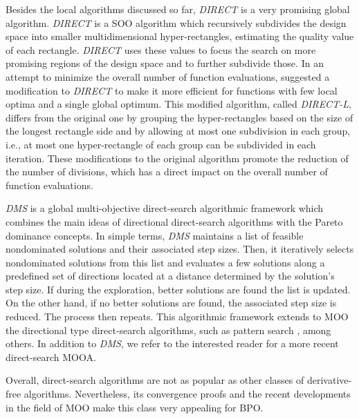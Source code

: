 	Besides the local algorithms discussed so far, \textit{\ac{DIRECT}} is a very promising global algorithm. \textit{\ac{DIRECT}} \cite{Jones1993DIRECT} is a \ac{SOO} algorithm which recursively subdivides the design space into smaller multidimensional hyper-rectangles, estimating the quality value of each rectangle. \textit{\ac{DIRECT}} uses these values to focus the search on more promising regions of the design space and to further subdivide those. In an attempt to minimize the overall number of function evaluations, \cite{Gablonsky2001} suggested a modification to \textit{\ac{DIRECT}} to make it more efficient for functions with few local optima and a single global optimum. This modified algorithm, called \textit{\ac{DIRECT}-L}, differs from the original one by grouping the hyper-rectangles based on the size of the longest rectangle side and by allowing at most one subdivision in each group, i.e., at most one hyper-rectangle of each group can be subdivided in each iteration. These modifications to the original algorithm promote the reduction of the number of divisions, which has a direct impact on the overall number of function evaluations.
	
	\textit{\ac{DMS}} \cite{Custodio2010} is a global multi-objective direct-search algorithmic framework which combines the main ideas of directional direct-search algorithms with the Pareto dominance concepts. In simple terms, \textit{\ac{DMS}} maintains a list of feasible nondominated solutions and their associated step sizes. Then, it iteratively selects nondominated solutions from this list and evaluates a few solutions along a predefined set of directions located at a distance determined by the solution's step size. If during the exploration, better solutions are found the list is updated. On the other hand, if no better solutions are found, the associated step size is reduced. The process then repeats. This algorithmic framework extends to \ac{MOO} the directional type direct-search algorithms, such as pattern search \cite{Kolda2003}, among others. In addition to \textit{\ac{DMS}}, we refer \cite{Custodio2018} to the interested reader for a more recent direct-search \ac{MOOA}.
	
	Overall, direct-search algorithms are not as popular as other classes of derivative-free algorithms. Nevertheless, its convergence proofs and the recent developments in the field of \ac{MOO} make this class very appealing for \ac{BPO}. 
	
